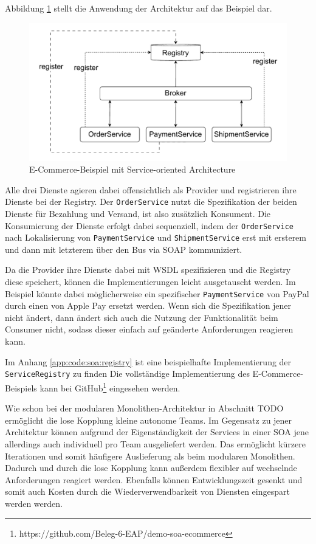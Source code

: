 \documentclass[acmtog]{acmart}
\begin{document}
Abbildung \ref{fig:soaecommerce} stellt die Anwendung der Architektur auf das Beispiel dar.
\begin{figure}[!h]
  \centering
  \includegraphics[width=0.8\linewidth]{images/soa/soa-example.pdf}
  \caption{E-Commerce-Beispiel mit Service-oriented Architecture}
  \label{fig:soaecommerce}
\end{figure}
Alle drei Dienste agieren dabei offensichtlich als Provider und registrieren ihre Dienste bei der Registry.
Der \texttt{OrderService} nutzt die Spezifikation der beiden Dienste für Bezahlung und Versand, ist also zusätzlich Konsument.
Die Konsumierung der Dienste erfolgt dabei sequenziell, indem der \texttt{OrderService} nach Lokalisierung von \texttt{PaymentService} und \texttt{ShipmentService}
erst mit ersterem und dann mit letzterem über den Bus via SOAP kommuniziert.

Da die Provider ihre Dienste dabei mit WSDL spezifizieren und die Registry diese speichert, können die Implementierungen leicht ausgetauscht werden.
Im Beispiel könnte dabei möglicherweise ein spezifischer \texttt{PaymentService} von PayPal durch einen von Apple Pay ersetzt werden.
Wenn sich die Spezifikation jener nicht ändert, dann ändert sich auch die Nutzung der Funktionalität beim Consumer nicht, sodass dieser einfach
auf geänderte Anforderungen reagieren kann.

Im Anhang \ref{app:code:soa:registry} ist eine beispielhafte Implementierung der \texttt{ServiceRegistry} zu finden
Die vollständige Implementierung des E-Commerce-Beispiels kann bei GitHub\footnote{https://github.com/Beleg-6-EAP/demo-soa-ecommerce} eingesehen werden.

Wie schon bei der modularen Monolithen-Architektur in Abschnitt TODO ermöglicht die lose Kopplung kleine autonome Teams.
Im Gegensatz zu jener Architektur können aufgrund der Eigenständigkeit der Services in einer SOA jene allerdings auch individuell pro Team ausgeliefert werden.
Das ermöglicht kürzere Iterationen und somit häufigere Auslieferung als beim modularen Monolithen.
Dadurch und durch die lose Kopplung kann außerdem flexibler auf wechselnde Anforderungen reagiert werden.
Ebenfalls können Entwicklungszeit gesenkt und somit auch Kosten durch die Wiederverwendbarkeit von Diensten eingespart werden werden.
\end{document}
